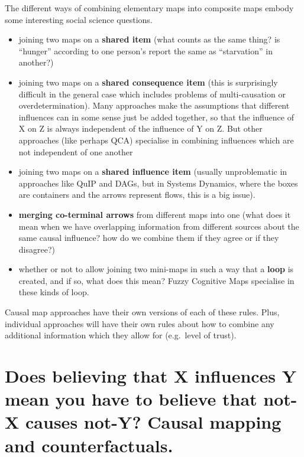 \documentclass[
]{book}
\providecommand{\tightlist}{%
  \setlength{\itemsep}{0pt}\setlength{\parskip}{0pt}}
\begin{document}
The different ways of combining elementary maps into composite maps embody some interesting social science questions.

\begin{itemize}
\tightlist
\item
  joining two maps on a \textbf{shared item} (what counts as the same thing? is ``hunger'' according to one person's report the same as ``starvation'' in another?)
\item
  joining two maps on a \textbf{shared consequence item} (this is surprisingly difficult in the general case which includes problems of multi-causation or overdetermination). Many approaches make the assumptions that different influences can in some sense just be added together, so that the influence of X on Z is always independent of the influence of Y on Z. But other approaches (like perhaps QCA) specialise in combining influences which are not independent of one another
\item
  joining two maps on a \textbf{shared influence item} (usually unproblematic in approaches like QuIP and DAGs, but in Systems Dynamics, where the boxes are containers and the arrows represent flows, this is a big issue).
\item
  \textbf{merging co-terminal arrows} from different maps into one (what does it mean when we have overlapping information from different sources about the same causal influence? how do we combine them if they agree or if they disagree?)
\item
  whether or not to allow joining two mini-maps in such a way that a \textbf{loop} is created, and if so, what does this mean? Fuzzy Cognitive Maps specialise in these kinds of loop.
\end{itemize}

Causal map approaches have their own versions of each of these rules. Plus, individual approaches will have their own rules about how to combine any additional information which they allow for (e.g.~level of trust).

\hypertarget{does-believing-that-x-influences-y-mean-you-have-to-believe-that-not-x-causes-not-y-causal-mapping-and-counterfactuals.}{%
\section{Does believing that X influences Y mean you have to believe that not-X causes not-Y? Causal mapping and counterfactuals.}\label{does-believing-that-x-influences-y-mean-you-have-to-believe-that-not-x-causes-not-y-causal-mapping-and-counterfactuals.}}
\end{document}
